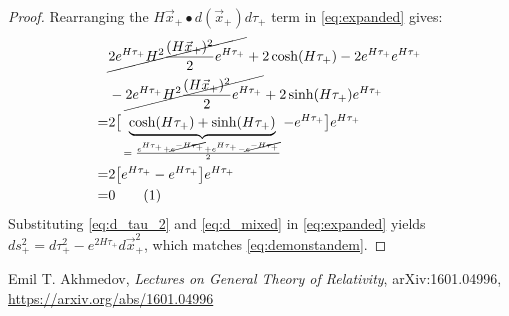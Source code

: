 \documentclass[]{article}
\newcommand\numberthis{\addtocounter{equation}{1}\tag{\theequation}}
\begin{document}
\begin{proof}
	Rearranging the $H\vec{x}_+\bullet d(\vec{x}_+)d\tau_+$ term in \eqref{eq:expanded} gives:
	\begin{align*}
&\cancel{2e^{H\tau_+} H^2\frac{(H\vec{x}_+)^2}{2}e^{H\tau_+}}+2\cosh(H\tau_+) - 2e^{H\tau_+}  e^{H\tau_+}\\
&-\cancel{2e^{H\tau_+} H^2\frac{(H\vec{x}_+)^2}{2}e^{H\tau_+}}+2\sinh(H\tau_+)e^{H\tau_+}\\
=&2\big[\underbrace{\cosh(H\tau_+)+\sinh(H\tau_+)}_\text{$=\frac{e^{H\tau_+}+\cancel{e^{-H\tau_+}}+e^{H\tau_+}-\cancel{e^{-H\tau_+}}}{2}$}-e^{H\tau_+}\big]e^{H\tau_+}\\
=&2\big[e^{H\tau_+}-e^{H\tau_+}\big]e^{H\tau_+}\\
=&0\numberthis\label{eq:d_mixed}
	\end{align*}
Substituting \eqref{eq:d_tau_2} and \eqref{eq:d_mixed} in \eqref{eq:expanded} yields $ds^2_+=d\tau^2_+ - e^{2H\tau_+}d\vec{x}^2_+$, which matches \eqref{eq:demonstandem}.
\end{proof}

\begin{thebibliography}{9}\label{section:biblio}
	\raggedright
	Emil T. Akhmedov,
	\emph{Lectures on General Theory of Relativity},
	arXiv:1601.04996,
	\url{https://arxiv.org/abs/1601.04996}
\end{thebibliography}
\end{document}
